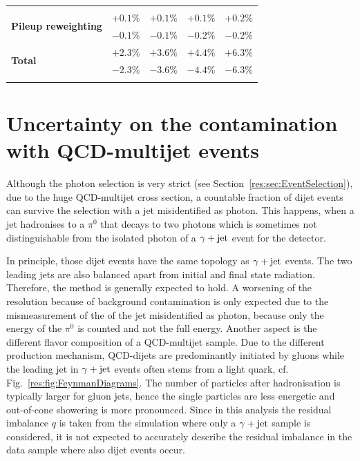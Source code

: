 \begin{table}[h]
{\begin{tabular}{l  c  c  c  c}
\multicolumn{5}{c}{} \\
\multirow{2}{*}{\textbf{Pileup reweighting}}& $+0.1 \% $ & $+0.1 \% $ & $+0.1 \% $ & $+0.2 \% $ \\
& $-0.1 \% $ & $-0.1 \% $ & $-0.2 \% $ & $-0.2 \% $ \\
\midrule
\multirow{2}{*}{\textbf{Total}}& $+2.3 \% $ & $+3.6 \% $ & $+4.4 \% $ & $+6.3 \% $ \\
& $-2.3 \% $ & $-3.6 \% $ & $-4.4 \% $ & $-6.3 \% $ \\
\bottomrule
\multicolumn{5}{c}{} \\
\end{tabular}}
\end{table} 


\section*{Uncertainty on the contamination with QCD-multijet events}
Although the photon selection is very strict (see Section~\ref{res:sec:EventSelection}), 
due to the huge QCD-multijet cross section, a countable fraction of dijet events can survive the selection with a jet misidentified as photon.
This happens, when \eg a jet hadronises to a $\pi^0$ that decays to two photons which is sometimes not distinguishable from the isolated photon of a $\gamma + \text{jet}$ event for the detector.

In principle, those dijet events have the same topology as $\gamma + \text{jet}$ events. The two leading jets are also balanced apart from initial and final state radiation. 
Therefore, the method is generally expected to hold. 
A worsening of the resolution because of background contamination is only expected due to the mismeasurement of the \pt of the jet misidentified as photon, because only the energy of the $\pi^0$ is counted and not the full energy.
Another aspect is the different flavor composition of a QCD-multijet sample. 
Due to the different production mechanism, QCD-dijets are predominantly initiated by gluons while the leading jet in $\gamma + \text{jet}$ events often stems from a light quark, cf. Fig.~\ref{res:fig:FeynmanDiagrams}.
The number of particles after hadronisation is typically larger for gluon jets, hence the single particles are less energetic and out-of-cone showering is more pronounced.
Since in this analysis the residual imbalance $q$ is taken from the simulation where only a $\gamma + \text{jet}$ sample is considered, it is not expected to accurately describe the residual imbalance in the data sample where also dijet events occur.


